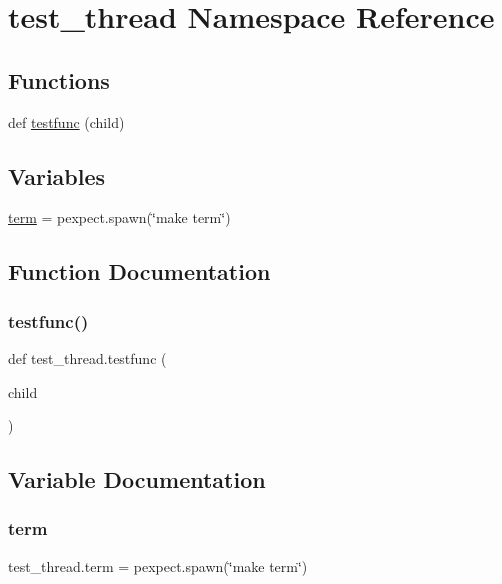 \hypertarget{namespacetest__thread}{}\section{test\+\_\+thread Namespace Reference}
\label{namespacetest__thread}
\subsection*{Functions}
\begin{DoxyCompactItemize}
\item 
def \hyperlink{namespacetest__thread_a477ddcfba0824c61c8bca1ababd2fd2d}{testfunc} (child)
\end{DoxyCompactItemize}
\subsection*{Variables}
\begin{DoxyCompactItemize}
\item 
\hyperlink{namespacetest__thread_aec19c10ee86e39ac15535965e4e08c5d}{term} = pexpect.\+spawn(\char`\"{}make term\char`\"{})
\end{DoxyCompactItemize}


\subsection{Function Documentation}
\mbox{\label{namespacetest__thread_a477ddcfba0824c61c8bca1ababd2fd2d}} 
\subsubsection{\texorpdfstring{testfunc()}{testfunc()}}
{\footnotesize\ttfamily def test\+\_\+thread.\+testfunc (\begin{DoxyParamCaption}\item[{}]{child }\end{DoxyParamCaption})}



\subsection{Variable Documentation}
\mbox{\label{namespacetest__thread_aec19c10ee86e39ac15535965e4e08c5d}} 
\subsubsection{\texorpdfstring{term}{term}}
{\footnotesize\ttfamily test\+\_\+thread.\+term = pexpect.\+spawn(\char`\"{}make term\char`\"{})}

